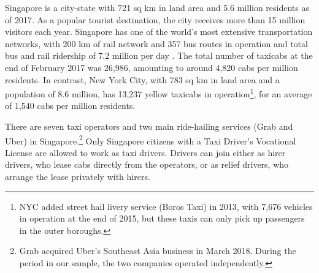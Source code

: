 \documentclass[reviewmode]{restud}
\begin{document}
Singapore is a city-state with 721 sq km in land area and 5.6 million residents as of 2017. As a popular tourist destination, the city receives more than 15 million visitors each year.
Singapore has one of the world's most extensive transportation networks, with 200 km of rail network and
357 bus routes in operation
and total bus and rail ridership of 7.2 million per day%
.
The total number of taxicabs at the end of February 2017 was 26,986, amounting to around 4,820 cabs per million residents. In contrast, New York City, with 783 sq km in land area and a population of 8.6 million, has 13,237 yellow taxicabs in operation\footnote{NYC added street hail livery service (Boros Taxi) in 2013, with 7,676 vehicles in operation at the end of 2015, but these taxis can only pick up passengers in the outer boroughs.}, for an average of 1,540 cabs per million residents.

There are seven taxi operators 
and two main ride-hailing services (Grab and Uber) in Singapore.\footnote{Grab acquired Uber's Southeast Asia business in March 2018. %
During the period in our sample, the two companies operated independently.} Only Singapore citizens with a Taxi Driver's Vocational License are allowed to work as taxi drivers. Drivers can join either as hirer drivers, who lease cabs directly from the operators, or as relief drivers, who arrange the lease privately with hirers.
\end{document}
